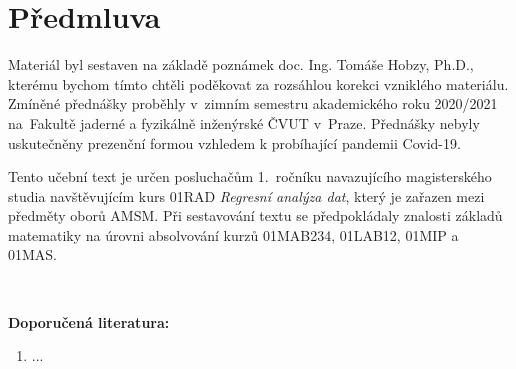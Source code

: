\chapter*{Předmluva}

Materiál byl sestaven na základě poznámek doc. Ing. Tomáše Hobzy, Ph.D., kterému bychom tímto chtěli poděkovat za rozsáhlou korekci vzniklého materiálu. Zmíněné přednášky proběhly v~zimním semestru akademického roku 2020/2021 na~Fakultě jaderné a
fyzikálně inženýrské ČVUT v~Praze. Přednášky nebyly uskutečněny prezenční formou vzhledem k probíhající pandemii Covid-19. 

Tento učební text je určen posluchačům 1.~ročníku navazujícího magisterského studia navštěvujícím kurs 01RAD\emph{	Regresní analýza dat}, který je zařazen
mezi předměty oborů AMSM. Při sestavování textu se předpokládaly znalosti základů matematiky na úrovni absolvování kurzů 01MAB234, 01LAB12, 01MIP a 01MAS.

~

\textbf{Doporučená literatura:}
\begin{enumerate}[(1)]
  \item ...
\end{enumerate}
